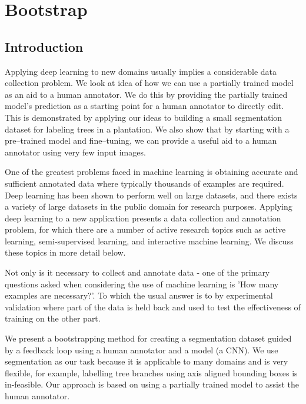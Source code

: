 


\chapter{Bootstrap}
 


\section {Introduction}


Applying deep learning to new domains usually implies a considerable data collection problem. We look at idea of how we can use a partially trained model as an aid to a human annotator. We do this by providing the partially trained model's prediction as a starting point for a human annotator to directly edit. This is demonstrated by applying our ideas to building a small segmentation dataset for labeling trees in a plantation. We also show that by starting with a pre--trained model and fine--tuning, we can provide a useful aid to a human annotator using very few input images.


One of the greatest problems faced in machine learning is obtaining accurate and sufficient annotated data where typically thousands of examples are required. Deep learning has been shown to perform well on large datasets, and there exists a variety of large datasets in the public domain for research purposes. Applying deep learning to a new application presents a data collection and annotation problem, for which there are a number of active research topics such as active learning, semi-supervised learning, and interactive machine learning. We discuss these topics in more detail below.

Not only is it necessary to collect and annotate data - one of the primary questions asked when considering the use of machine learning is 'How many examples are necessary?'. To which the usual answer is to by experimental validation where part of the data is held back and used to test the effectiveness of training on the other part.

We present a bootstrapping method for creating a segmentation dataset guided by a feedback loop using a human annotator and a model (a \gls{CNN}). We use segmentation as our task because it is applicable to many domains and is very flexible, for example, labelling tree branches using axis aligned bounding boxes is in-feasible. Our approach is based on using a partially trained model to assist the human annotator.

